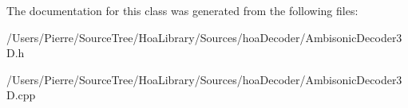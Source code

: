 The documentation for this class was generated from the following files\-:\begin{DoxyCompactItemize}
\item 
/\-Users/\-Pierre/\-Source\-Tree/\-Hoa\-Library/\-Sources/hoa\-Decoder/Ambisonic\-Decoder3\-D.\-h\item 
/\-Users/\-Pierre/\-Source\-Tree/\-Hoa\-Library/\-Sources/hoa\-Decoder/Ambisonic\-Decoder3\-D.\-cpp\end{DoxyCompactItemize}
